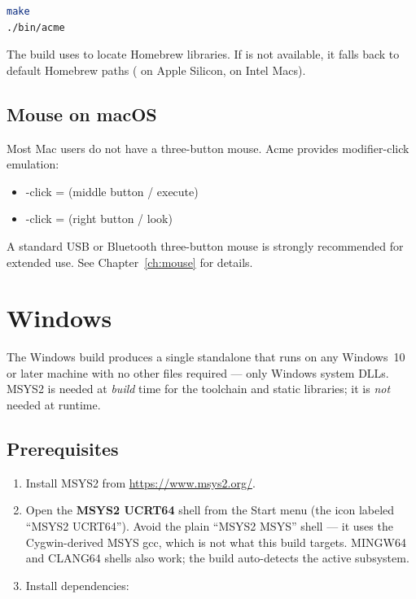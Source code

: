 \begin{lstlisting}[language=bash]
make
./bin/acme
\end{lstlisting}

The build uses  to locate Homebrew libraries.  If
 is not available, it falls back to default Homebrew
paths ( on Apple Silicon,  on
Intel Macs).

\subsection{Mouse on macOS}

Most Mac users do not have a three-button mouse.  Acme provides
modifier-click emulation:

\begin{itemize}
\item {}-click =  (middle button / execute)
\item {}-click =  (right button / look)
\end{itemize}

A standard USB or Bluetooth three-button mouse is strongly recommended
for extended use.  See Chapter~\ref{ch:mouse} for details.

\section{Windows}
\label{sec:install-windows}


The Windows build produces a single standalone  that
runs on any Windows~10 or later machine with no other files
required --- only Windows system DLLs.  MSYS2 is needed at
\emph{build} time for the toolchain and static libraries; it is
\emph{not} needed at runtime.

\subsection{Prerequisites}

\begin{enumerate}
\item Install MSYS2 from \url{https://www.msys2.org/}.
\item Open the \textbf{MSYS2 UCRT64} shell from the Start menu
      (the icon labeled ``MSYS2 UCRT64'').  Avoid the plain
      ``MSYS2 MSYS'' shell --- it uses the Cygwin-derived MSYS gcc,
      which is not what this build targets.  MINGW64 and CLANG64
      shells also work; the build auto-detects the active subsystem.
\item Install dependencies:
\end{enumerate}

